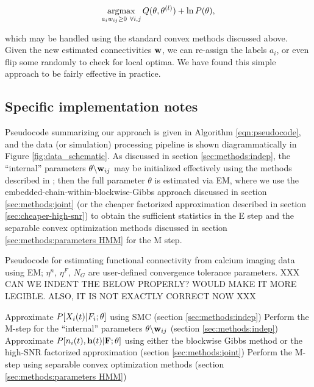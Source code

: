 \begin{equation}
\argmax_{\substack{a_i \w_{ij} \geq 0 ~ \forall i,j}} Q(\bth,\bth^{(l)}) +
\ln P(\theta),
\end{equation}

which may be handled using the standard convex methods discussed
above.  Given the new estimated connectivities $\mathbf{w}$, we can re-assign
the labels $a_i$, or even flip some randomly to check for local
optima.  We have found this simple approach to be fairly effective in
practice.


\subsection{Specific implementation notes} \label{sec:methods:specific_implementation}

Pseudocode summarizing our approach is given in Algorithm \ref{eqn:pseudocode}, and the data (or simulation) processing pipeline is shown diagrammatically in Figure \ref{fig:data_schematic}. As discussed in section \ref{sec:methods:indep}, the ``internal'' parameters $\theta \backslash \mathbf{w}_{ij}$ may be initialized effectively using the methods described in \cite{Vogelstein2009}; then the full parameter $\theta$ is estimated via EM, where we use the embedded-chain-within-blockwise-Gibbs approach discussed in section \ref{sec:methods:joint} (or the cheaper factorized approximation described in section \ref{sec:cheaper-high-snr}) to obtain the sufficient statistics in the E step and the separable convex optimization methods discussed in section \ref{sec:methods:parameters HMM} for the M step.

\begin{algorithm}
\caption{Pseudocode for estimating functional connectivity from
calcium imaging data using EM; $\eta^n$, $\eta^F$, $N_G$ are
user-defined convergence tolerance parameters.   XXX CAN WE INDENT
THE BELOW PROPERLY?  WOULD MAKE IT MORE LEGIBLE.  ALSO, IT IS NOT EXACTLY CORRECT NOW XXX}
\label{eqn:pseudocode}
\begin{algorithmic}
      \State Approximate $P[X_i(t)|F_i; \mathbf{\theta}]$ using SMC (section
  \ref{sec:methods:indep})
      \State Perform the M-step for the ``internal'' parameters
  $\theta \backslash \mathbf{w}_{ij}$ (section \ref{sec:methods:indep}) 
    \EndWhile
  \EndFor
      \State Approximate $P[n_i(t), \mathbf{h}(t) |{\bf F}; \mathbf{\theta}]$ using
  either the blockwise Gibbs method or the high-SNR
  factorized approximation (section \ref{sec:methods:joint})
    \EndFor
  	\State Perform the M-step using separable convex optimization
  methods (section \ref{sec:methods:parameters HMM})  
  \EndFor
\EndWhile
\end{algorithmic}
\end{algorithm}

